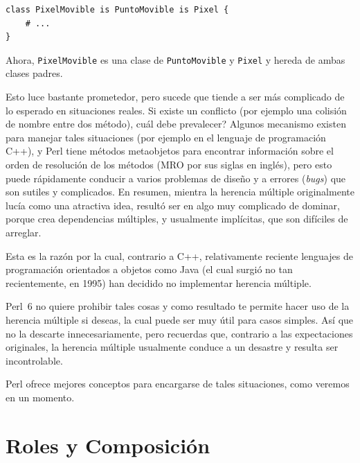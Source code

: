 \begin{lstlisting}
class PixelMovible is PuntoMovible is Pixel {
    # ...
}
\end{lstlisting}

Ahora, {\tt PixelMovible} es una clase de {\tt PuntoMovible}
y {\tt Pixel} y hereda de ambas clases padres.

Esto luce bastante prometedor, pero sucede que tiende a ser
más complicado de lo esperado en situaciones reales. Si existe
un conflicto (por ejemplo una colisión de nombre entre dos método),
cuál debe prevalecer? Algunos mecanismo existen para manejar tales
situaciones (por ejemplo en el lenguaje de programación C++), y
Perl tiene métodos metaobjetos para encontrar información
sobre el orden de resolución de los métodos (MRO por sus siglas en inglés),
pero esto puede rápidamente conducir a varios problemas de diseño y a
errores (\emph{bugs}) que son sutiles y complicados. En resumen, 
mientra la herencia múltiple originalmente lucía como una atractiva idea, 
resultó ser en algo muy complicado de dominar,
porque crea dependencias múltiples, y usualmente implícitas, que son 
difíciles de arreglar.

Esta es la razón por la cual, contrario a C++, relativamente reciente lenguajes de programación orientados a objetos como Java (el cual surgió no tan recientemente, en 1995) han decidido no implementar herencia múltiple.

Perl~6 no quiere prohibir tales cosas y como resultado te permite
hacer uso de la herencia múltiple si deseas, la cual puede ser 
muy útil para casos simples. Así que no la descarte innecesariamente,
pero recuerdas que, contrario a las expectaciones originales, 
la herencia múltiple usualmente conduce a un desastre y resulta
ser incontrolable.

Perl ofrece mejores conceptos para encargarse de tales situaciones, como
veremos en un momento.

\section{Roles y Composición}

